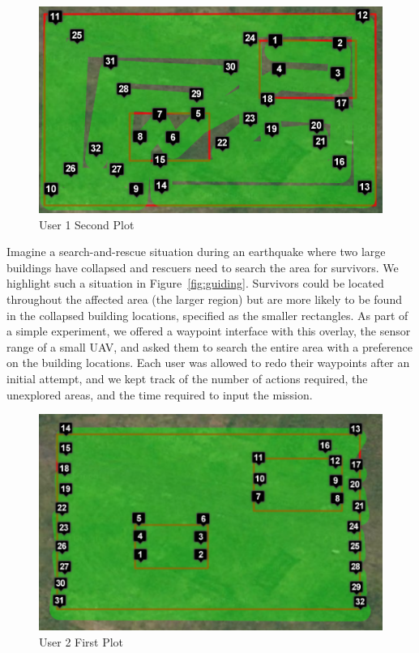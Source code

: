 \documentclass{sig-alternate-ipsn13}
\begin{document}
\begin{figure}[h]
  \centering
  \includegraphics[scale=0.4]{user_waypoints_2}
  \caption{User 1 Second Plot}
  \label{fig:user1_2}
\end{figure}


Imagine a search-and-rescue situation during an earthquake where two large
buildings have collapsed and rescuers need to search the area for survivors. We
highlight such a situation in Figure~\ref{fig:guiding}. Survivors could be located
throughout the affected area (the larger region) but are more likely to be found
in the collapsed building locations, specified as the smaller rectangles. As part
of a simple experiment, we offered a waypoint interface with this overlay, the
sensor range of a small UAV, and asked them to search the entire area with
a preference on the building locations. Each user was allowed to redo their
waypoints after an initial attempt, and we kept track of the number of actions
required, the unexplored areas, and the time required to input the mission.

\iffalse

\begin{figure}[h]
  \centering
  \includegraphics[scale=0.45]{user_waypoints_3}
  \caption{User 2 First  Plot}
  \label{fig:user2_1}
\end{figure}
\end{document}
